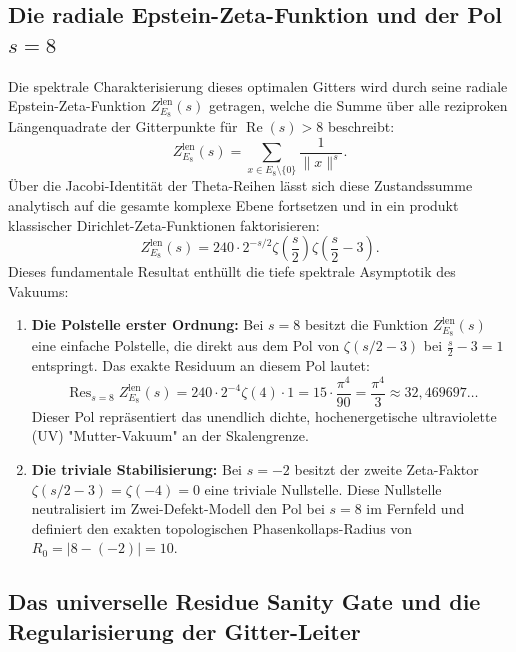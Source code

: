 \documentclass[11pt,a4paper]{article}
\theoremstyle{definition}
\begin{document}
	\subsection{Die radiale Epstein-Zeta-Funktion und der Pol $s=8$}
	Die spektrale Charakterisierung dieses optimalen Gitters wird durch seine radiale Epstein-Zeta-Funktion $Z^{\mathrm{len}}_{E_8}(s)$ getragen, welche die Summe über alle reziproken Längenquadrate der Gitterpunkte für $\operatorname{Re}(s) > 8$ beschreibt:
	\begin{equation}
		Z^{\mathrm{len}}_{E_8}(s) = \sum_{x \in E_8 \setminus \{0\}} \frac{1}{\|x\|^s}.
	\end{equation}
	Über die Jacobi-Identität der Theta-Reihen lässt sich diese Zustandssumme analytisch auf die gesamte komplexe Ebene fortsetzen und in ein produkt klassischer Dirichlet-Zeta-Funktionen faktorisieren:
	\begin{equation}
		\label{eq:epstein_factor}
		Z^{\mathrm{len}}_{E_8}(s) = 240 \cdot 2^{-s/2} \zeta\left(\frac{s}{2}\right)\zeta\left(\frac{s}{2}-3\right).
	\end{equation}
	Dieses fundamentale Resultat enthüllt die tiefe spektrale Asymptotik des Vakuums:
	\begin{enumerate}
		\item \textbf{Die Polstelle erster Ordnung:} Bei $s = 8$ besitzt die Funktion $Z^{\mathrm{len}}_{E_8}(s)$ eine einfache Polstelle, die direkt aus dem Pol von $\zeta(s/2-3)$ bei $\frac{s}{2}-3 = 1$ entspringt. Das exakte Residuum an diesem Pol lautet:
		\begin{equation}
			\operatorname{Res}_{s=8} Z^{\mathrm{len}}_{E_8}(s) = 240 \cdot 2^{-4} \zeta(4) \cdot 1 = 15 \cdot \frac{\pi^4}{90} = \frac{\pi^4}{3} \approx 32{,}469697\dots
		\end{equation}
		Dieser Pol repräsentiert das unendlich dichte, hochenergetische ultraviolette (UV) "Mutter-Vakuum" an der Skalengrenze.
		\item \textbf{Die triviale Stabilisierung:} Bei $s = -2$ besitzt der zweite Zeta-Faktor $\zeta(s/2-3) = \zeta(-4) = 0$ eine triviale Nullstelle. Diese Nullstelle neutralisiert im Zwei-Defekt-Modell den Pol bei $s=8$ im Fernfeld und definiert den exakten topologischen Phasenkollaps-Radius von $R_0 = |8 - (-2)| = 10$.
	\end{enumerate}
	
	\subsection{Das universelle Residue Sanity Gate und die Regularisierung der Gitter-Leiter}
	\label{sec:residue_sanity_gate}
	
\end{document}

